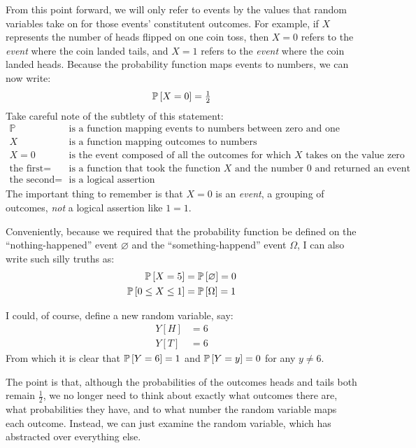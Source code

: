 From this point forward, we will only refer to events by the values that random
variables take on for those events' constitutent outcomes. For example, if
$X$ represents the number of heads flipped on one coin toss, then $X = 0$
refers to the \emph{event} where the coin landed tails, and $X = 1$ refers to
the \emph{event} where the coin landed heads. Because the probability function
maps events to numbers, we can now write:
\begin{equation*}
  \mathbb{P}\left[{X = 0}\right] = \tfrac{1}{2}
\end{equation*}
Take careful note of the subtlety of this statement:
\begin{align*}
  \mathbb{P} &\text{ is a function mapping events to numbers between zero and one} \\
  X &\text{ is a function mapping outcomes to numbers} \\
  X = 0 &\text{ is the event composed of all the outcomes for which $X$ takes on the value zero} \\
  \text{the first} = &\text{ is a function that took the function $X$ and the number $0$ and returned an event} \\
  \text{the second} = &\text{ is a logical assertion}
\end{align*}
The important thing to remember is that $X = 0$ is an \emph{event}, a grouping
of outcomes, \emph{not} a logical assertion like $1=1$.

Conveniently, because we required that the probability function be defined on
the ``nothing-happened'' event $\varnothing$ and the ``something-happend''
event $\Omega$, I can also write such silly truths as:
\begin{align*}
  \mathbb{P}\left[{X = 5}\right] &= \mathbb{P}\left[{\varnothing}\right] = 0 \\
  \mathbb{P}\left[{0 \leq X \leq 1}\right] &= \mathbb{P}\left[{\Omega}\right] = 1
\end{align*}

I could, of course, define a new random variable, say:
\begin{align*}
  Y[H] &= 6 \\
  Y[T] &= 6
\end{align*}
From which it is clear that $\mathbb{P}\left[{Y = 6}\right] = 1$ and $\mathbb{P}\left[{Y = y}\right] = 0$ for any
$y \neq 6$.

The point is that, although the probabilities of the outcomes heads and tails
both remain $\tfrac{1}{2}$, we no longer need to think about exactly what
outcomes there are, what probabilities they have, and to what number the random
variable maps each outcome. Instead, we can just examine the random variable,
which has abstracted over everything else.


